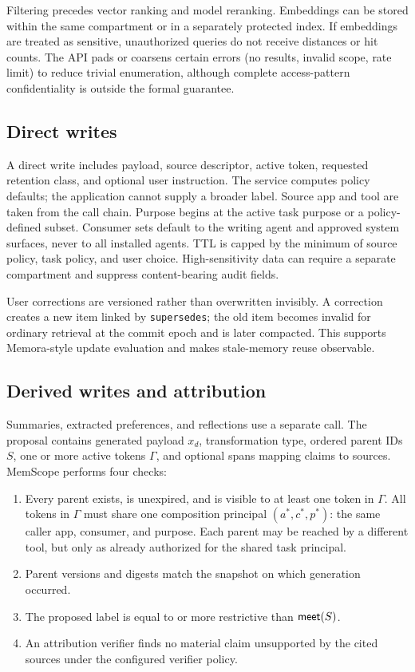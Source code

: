 Filtering precedes vector ranking and model reranking. Embeddings can be stored within the same compartment or in a separately protected index. If embeddings are treated as sensitive, unauthorized queries do not receive distances or hit counts. The API pads or coarsens certain errors (no results, invalid scope, rate limit) to reduce trivial enumeration, although complete access-pattern confidentiality is outside the formal guarantee.

\subsection{Direct writes}

A direct write includes payload, source descriptor, active token, requested retention class, and optional user instruction. The service computes policy defaults; the application cannot supply a broader label. Source app and tool are taken from the call chain. Purpose begins at the active task purpose or a policy-defined subset. Consumer sets default to the writing agent and approved system surfaces, never to all installed agents. TTL is capped by the minimum of source policy, task policy, and user choice. High-sensitivity data can require a separate compartment and suppress content-bearing audit fields.

User corrections are versioned rather than overwritten invisibly. A correction creates a new item linked by \texttt{supersedes}; the old item becomes invalid for ordinary retrieval at the commit epoch and is later compacted. This supports Memora-style update evaluation \citep{uddin2026memora} and makes stale-memory reuse observable.

\subsection{Derived writes and attribution}

Summaries, extracted preferences, and reflections use a separate call. The proposal contains generated payload $x_d$, transformation type, ordered parent IDs $S$, one or more active tokens $\Gamma$, and optional spans mapping claims to sources. MemScope performs four checks:

\begin{enumerate}[leftmargin=*]
  \item Every parent exists, is unexpired, and is visible to at least one token in $\Gamma$. All tokens in $\Gamma$ must share one composition principal $(a^*,c^*,p^*)$: the same caller app, consumer, and purpose. Each parent may be reached by a different tool, but only as already authorized for the shared task principal.
  \item Parent versions and digests match the snapshot on which generation occurred.
  \item The proposed label is equal to or more restrictive than $\mathsf{meet}(S)$.
  \item An attribution verifier finds no material claim unsupported by the cited sources under the configured verifier policy.
\end{enumerate}

